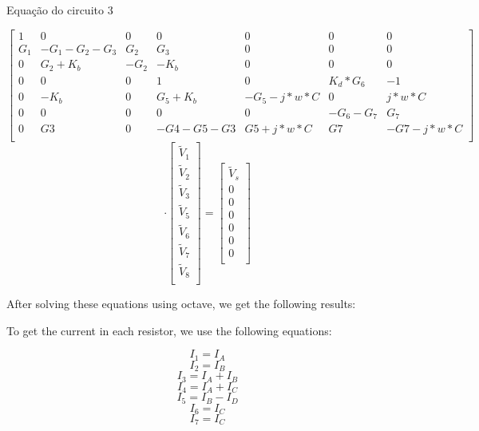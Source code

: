 \vspace{0.5cm}
Equação do circuito 3
\vspace{0.5cm}

\[
\begin{bmatrix}
1 & 0 & 0 & 0 & 0 & 0 & 0\\
G_1 & -G_1-G_2-G_3 & G_2 & G_3 & 0 & 0 & 0\\
0 & G_2+K_b & -G_2 & -K_b & 0 & 0 & 0\\
0 & 0 & 0 & 1 & 0 & K_d*G_6 & -1\\
0 & -K_b & 0 & G_5+K_b & -G_5-j*w*C & 0 & j*w*C\\
0 & 0 & 0 & 0 & 0 & -G_6-G_7 & G_7\\
0 & G3 & 0 & -G4-G5-G3 & G5+j*w*C & G7 & -G7-j*w*C \\
\end{bmatrix}
\]
\[
\cdot
\begin{bmatrix}
\tilde{V}_1\\
\tilde{V}_2\\
\tilde{V}_3\\
\tilde{V}_5\\
\tilde{V}_6\\
\tilde{V}_7\\
\tilde{V}_8\\
\end{bmatrix}
=
\begin{bmatrix}
\tilde{V}_s\\
0\\
0\\
0\\
0\\
0\\
0\\
\end{bmatrix}
\]


\vspace{0.5cm}

After solving these equations using octave, we get 
the following results:

\vspace{0.5cm}


\vspace{0.5cm}

To get the current in each resistor, we use the following equations:

\vspace{0.5cm}

$$ I_1 = I_A $$
$$ I_2 = I_B $$
$$ I_3 = I_A + I_B $$
$$ I_4 = I_A + I_C $$
$$ I_5 = I_B - I_D $$
$$ I_6 = I_C $$
$$ I_7 = I_C $$

